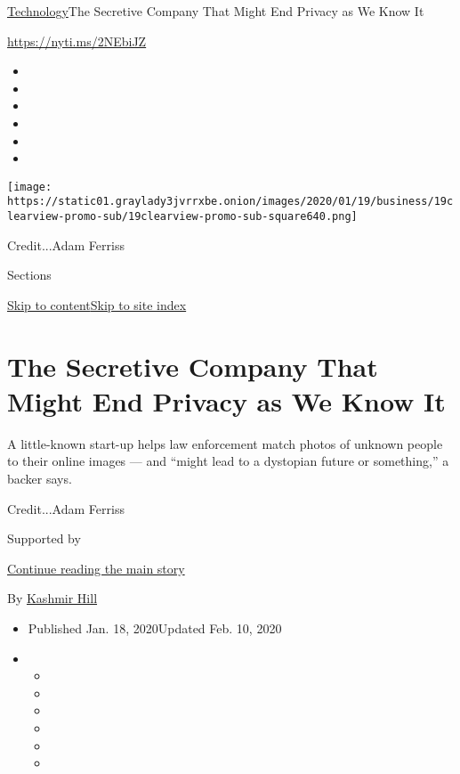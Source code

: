 \href{/section/technology}{Technology}\textbar{}The Secretive Company
That Might End Privacy as We Know It

\url{https://nyti.ms/2NEbiJZ}

\begin{itemize}
\item
\item
\item
\item
\item
\item
\end{itemize}

\texttt{[image: https://static01.graylady3jvrrxbe.onion/images/2020/01/19/business/19clearview-promo-sub/19clearview-promo-sub-square640.png]}

Credit...Adam Ferriss

Sections

\protect\hyperlink{site-content}{Skip to
content}\protect\hyperlink{site-index}{Skip to site index}

\hypertarget{the-secretive-company-that-might-end-privacy-as-we-know-it}{%
\section{The Secretive Company That Might End Privacy as We Know
It}\label{the-secretive-company-that-might-end-privacy-as-we-know-it}}

A little-known start-up helps law enforcement match photos of unknown
people to their online images --- and ``might lead to a dystopian future
or something,'' a backer says.

Credit...Adam Ferriss

Supported by

\protect\hyperlink{after-sponsor}{Continue reading the main story}

By \href{https://www.nytimes3xbfgragh.onion/by/kashmir-hill}{Kashmir
Hill}

\begin{itemize}
\item
  Published Jan. 18, 2020Updated Feb. 10, 2020
\item
  \begin{itemize}
  \item
  \item
  \item
  \item
  \item
  \item
  \end{itemize}
\end{itemize}

